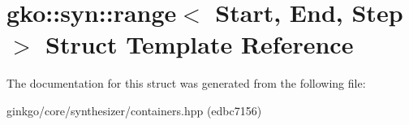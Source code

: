 \hypertarget{structgko_1_1syn_1_1range}{}\section{gko\+:\+:syn\+:\+:range$<$ Start, End, Step $>$ Struct Template Reference}
\label{structgko_1_1syn_1_1range}


The documentation for this struct was generated from the following file\+:\begin{DoxyCompactItemize}
\item 
ginkgo/core/synthesizer/containers.\+hpp (edbc7156)\end{DoxyCompactItemize}
